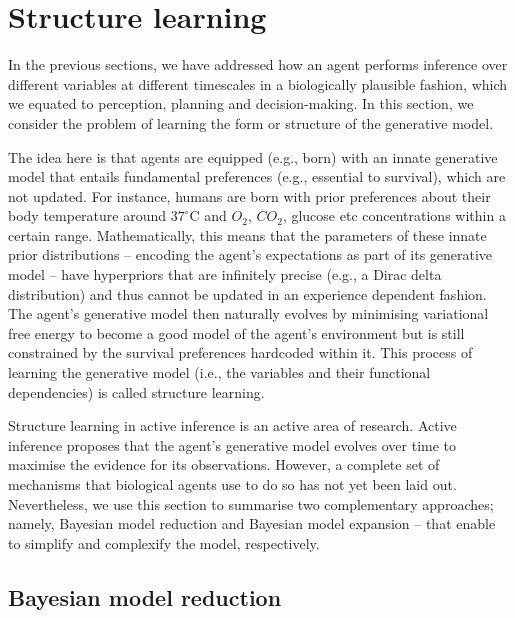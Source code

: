 \documentclass{article}
\begin{document}
\section{Structure learning}
\label{sec: structure learning}

In the previous sections, we have addressed how an agent performs inference over different variables at different timescales in a biologically plausible fashion, which we equated to perception, planning and decision-making. In this section, we consider the problem of learning the form or structure of the generative model.

The idea here is that agents are equipped (e.g., born) with an innate generative model that entails fundamental preferences (e.g., essential to survival), which are not updated. For instance, humans are born with prior preferences about their body temperature around $37^\circ$C and $O_2$, $CO_2$, glucose etc concentrations within a certain range. Mathematically, this means that the parameters of these innate prior distributions -- encoding the agent’s expectations as part of its generative model -- have hyperpriors that are infinitely precise (e.g., a Dirac delta distribution) and thus cannot be updated in an experience dependent fashion. The agent’s generative model then naturally evolves by minimising variational free energy to become a good model of the agent’s environment but is still constrained by the survival preferences hardcoded within it. This process of learning the generative model (i.e., the variables and their functional dependencies) is called structure learning.

Structure learning in active inference is an active area of research. Active inference proposes that the agent’s generative model evolves over time to maximise the evidence for its observations. However, a complete set of mechanisms that biological agents use to do so has not yet been laid out. Nevertheless, we use this section to summarise two complementary approaches; namely, Bayesian model reduction and Bayesian model expansion \cite{fristonActiveInferenceCuriosity2017,fristonPostHocBayesian2011,smithActiveInferenceModel2019,fristonBayesianModelReduction2018} – that enable to simplify and complexify the model, respectively.

\subsection{Bayesian model reduction}
\end{document}
